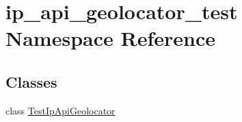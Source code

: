 \hypertarget{namespaceip__api__geolocator__test}{\section{ip\-\_\-api\-\_\-geolocator\-\_\-test Namespace Reference}
\label{namespaceip__api__geolocator__test}
}
\subsection*{Classes}
\begin{DoxyCompactItemize}
\item 
class \hyperlink{classip__api__geolocator__test_1_1TestIpApiGeolocator}{Test\-Ip\-Api\-Geolocator}
\end{DoxyCompactItemize}
